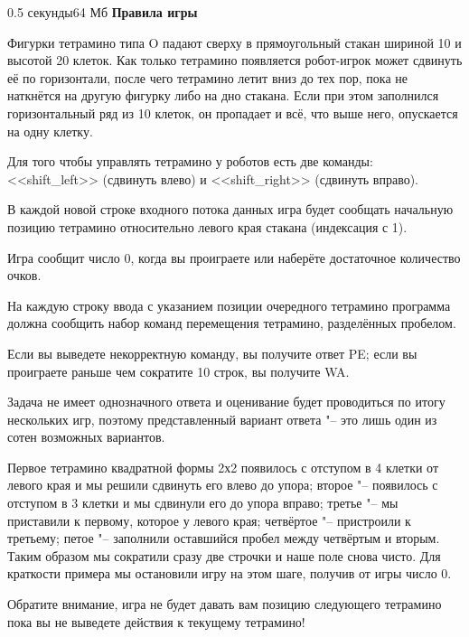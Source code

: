 \begin{problem}{}{}{}{0.5 секунды}{64 Мб}
{\bf {Правила игры}}

Фигурки тетрамино типа O падают сверху в прямоугольный стакан шириной 10 и высотой 20 клеток.
Как только тетрамино появляется робот-игрок может сдвинуть её по горизонтали, после чего
тетрамино летит вниз до тех пор, пока не наткнётся на другую фигурку либо на дно стакана. Если
при этом заполнился горизонтальный ряд из 10 клеток, он пропадает и всё, что выше него,
опускается на одну клетку.

Для того чтобы управлять тетрамино у роботов есть две команды: <<shift_left>> (сдвинуть влево) и
<<shift_right>> (сдвинуть вправо).

\InputFile
В каждой новой строке входного потока данных игра будет сообщать начальную позицию тетрамино
относительно левого края стакана (индексация с 1).

Игра сообщит число 0, когда вы проиграете или наберёте достаточное количество очков.

\OutputFile
На каждую строку ввода с указанием позиции очередного тетрамино программа должна сообщить набор
команд перемещения тетрамино, разделённых пробелом.

Если вы выведете некорректную команду, вы получите ответ PE; если вы проиграете раньше чем
сократите 10 строк, вы получите WA.

\Example

\begin{example}
%
\end{example}

\Note
Задача не имеет однозначного ответа и оценивание будет проводиться по итогу нескольких игр, 
поэтому представленный вариант ответа "-- это лишь один из сотен возможных вариантов.

Первое тетрамино квадратной формы 2х2 появилось с отступом в 4 клетки от левого края и мы
решили сдвинуть его влево до упора; второе "-- появилось с отступом в 3 клетки и мы сдвинули
его до упора вправо; третье "-- мы приставили к первому, которое у левого края; четвёртое "--
пристроили к третьему; петое "-- заполнили оставшийся пробел между четвёртым и вторым. Таким
образом мы сократили сразу две строчки и наше поле снова чисто. Для краткости примера мы
остановили игру на этом шаге, получив от игры число 0.

Обратите внимание, игра не будет давать вам позицию следующего тетрамино пока вы не выведете
действия к текущему тетрамино!

\end{problem}

